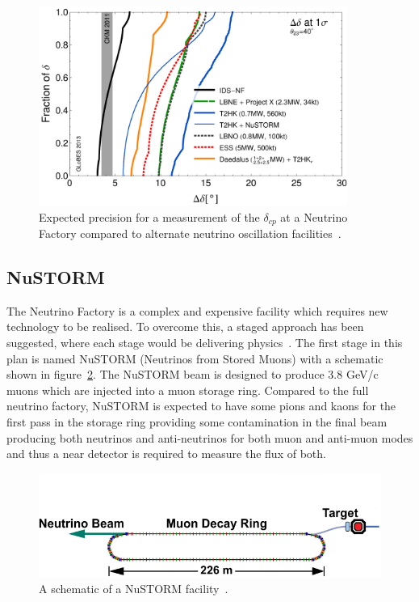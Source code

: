 \begin{figure}[h!]
\centering
\includegraphics[width=0.9\textwidth]{figures/rdr-cp-precision-comparison-131216.pdf}
\caption{Expected precision for a measurement of the $\delta_{cp}$ at a Neutrino Factory compared to alternate neutrino oscillation facilities~\cite{Fix7}.}
\label{fig:nuFactExp}
\end{figure}



\subsection{NuSTORM}\label{subsec:NuSTORM}

The Neutrino Factory is a complex and expensive facility which requires new technology to be realised. To overcome this, a staged approach has been suggested, where each stage would be delivering physics~\cite{Fix7}. The first stage in this plan is named NuSTORM (Neutrinos from Stored Muons) with a schematic shown in figure~\ref{fig:nuStorm}. The NuSTORM beam is designed to produce 3.8 GeV/c muons which are injected into a muon storage ring. Compared to the full neutrino factory, NuSTORM is expected to have some pions and kaons for the first pass in the storage ring providing some contamination in the final beam producing both neutrinos and anti-neutrinos for both muon and anti-muon modes and thus a near detector is required to measure the flux of both. 

\begin{figure}[h!]
\centering
\includegraphics[width=\textwidth]{figures/nuSTORM_schematic.pdf}
\caption{A schematic of a NuSTORM facility~\cite{Fix7}.}
\label{fig:nuStorm}
\end{figure}

